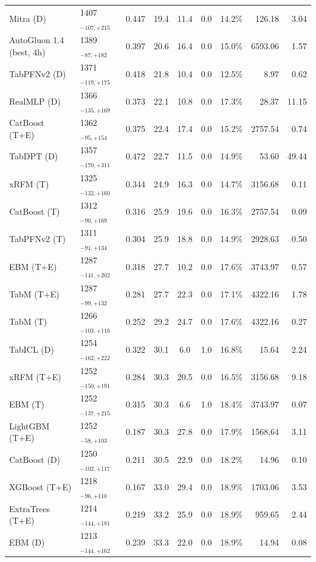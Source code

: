 \begin{tabular}{llcccccrr}
Mitra (D) & 1407${}_{-107,+215}$ & 0.447 & 19.4 & 11.4 & 0.0 & 14.2\% & 126.18 & 3.04 \\
AutoGluon 1.4 (best, 4h) & 1389${}_{-87,+182}$ & 0.397 & 20.6 & 16.4 & 0.0 & 15.0\% & 6593.06 & 1.57 \\
TabPFNv2 (D) & 1371${}_{-119,+175}$ & 0.418 & 21.8 & 10.4 & 0.0 & 12.5\% & 8.97 & 0.62 \\
RealMLP (D) & 1366${}_{-135,+169}$ & 0.373 & 22.1 & 10.8 & 0.0 & 17.3\% & 28.37 & 11.15 \\
CatBoost (T+E) & 1362${}_{-95,+154}$ & 0.375 & 22.4 & 17.4 & 0.0 & 15.2\% & 2757.54 & 0.74 \\
TabDPT (D) & 1357${}_{-170,+311}$ & 0.472 & 22.7 & 11.5 & 0.0 & 14.9\% & 53.60 & 49.44 \\
xRFM (T) & 1325${}_{-132,+160}$ & 0.344 & 24.9 & 16.3 & 0.0 & 14.7\% & 3156.68 & 0.11 \\
CatBoost (T) & 1312${}_{-90,+169}$ & 0.316 & 25.9 & 19.6 & 0.0 & 16.3\% & 2757.54 & 0.09 \\
TabPFNv2 (T) & 1311${}_{-91,+134}$ & 0.304 & 25.9 & 18.8 & 0.0 & 14.9\% & 2928.63 & 0.50 \\
EBM (T+E) & 1287${}_{-141,+202}$ & 0.318 & 27.7 & 10.2 & 0.0 & 17.6\% & 3743.97 & 0.57 \\
TabM (T+E) & 1287${}_{-99,+132}$ & 0.281 & 27.7 & 22.3 & 0.0 & 17.1\% & 4322.16 & 1.78 \\
TabM (T) & 1266${}_{-103,+116}$ & 0.252 & 29.2 & 24.7 & 0.0 & 17.6\% & 4322.16 & 0.27 \\
TabICL (D) & 1254${}_{-162,+222}$ & 0.322 & 30.1 & 6.0 & 1.0 & 16.8\% & 15.64 & 2.24 \\
xRFM (T+E) & 1252${}_{-150,+191}$ & 0.284 & 30.3 & 20.5 & 0.0 & 16.5\% & 3156.68 & 9.18 \\
EBM (T) & 1252${}_{-137,+215}$ & 0.315 & 30.3 & 6.6 & 1.0 & 18.4\% & 3743.97 & 0.07 \\
LightGBM (T+E) & 1252${}_{-58,+103}$ & 0.187 & 30.3 & 27.8 & 0.0 & 17.9\% & 1568.64 & 3.11 \\
CatBoost (D) & 1250${}_{-102,+117}$ & 0.211 & 30.5 & 22.9 & 0.0 & 18.2\% & 14.96 & 0.10 \\
XGBoost (T+E) & 1218${}_{-96,+110}$ & 0.167 & 33.0 & 29.4 & 0.0 & 18.9\% & 1703.06 & 3.53 \\
ExtraTrees (T+E) & 1214${}_{-144,+181}$ & 0.219 & 33.2 & 25.9 & 0.0 & 18.9\% & 959.65 & 2.44 \\
EBM (D) & 1213${}_{-144,+162}$ & 0.239 & 33.3 & 22.0 & 0.0 & 18.9\% & 14.94 & 0.08 \\

\end{tabular}
